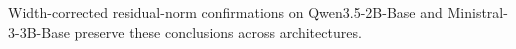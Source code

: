 Width-corrected residual-norm confirmations on Qwen3.5-2B-Base and
Ministral-3-3B-Base preserve these conclusions across architectures.
